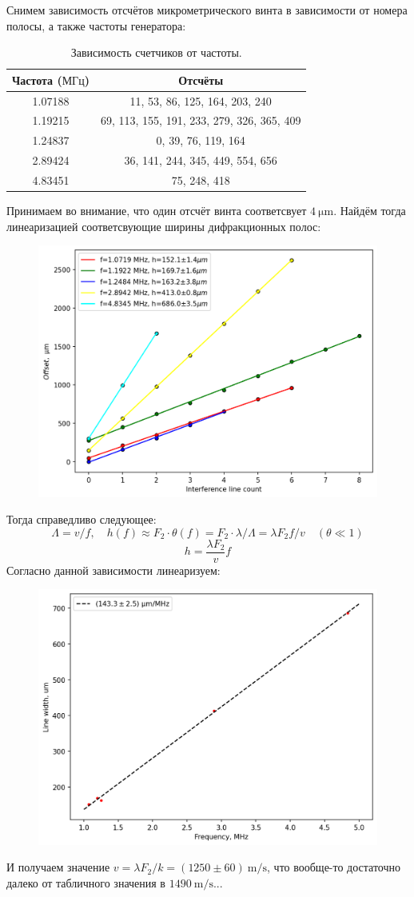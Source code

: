 \documentclass[12pt, a4paper]{article}
\begin{document}
Снимем зависимость отсчётов микрометрического винта в зависимости от номера полосы, а также частоты
генератора:
\begin{table}[H]
  \centering
  \begin{tabular}{|c|c|}
      \hline
      Частота ($\text{МГц}$) & Отсчёты \\ \hline
      1.07188 & 11, 53, 86, 125, 164, 203, 240 \\ \hline
      1.19215 & 69, 113, 155, 191, 233, 279, 326, 365, 409 \\ \hline
      1.24837 & 0, 39, 76, 119, 164 \\ \hline
      2.89424 & 36, 141, 244, 345, 449, 554, 656 \\ \hline
      4.83451 & 75, 248, 418 \\ \hline
  \end{tabular}
  \caption{Зависимость счетчиков от частоты.}
  \label{freq_counts_table}
\end{table}
Принимаем во внимание, что один отсчёт винта соответсвует $4~\mathrm{\mu m}$.
Найдём тогда линеаризацией соответсвующие ширины дифракционных полос:
\begin{figure}[H]
  \includegraphics[width=0.75\linewidth]{pics/line count.png}
\end{figure}
Тогда справедливо следующее:
$$\Lambda = v/f, \quad h(f) \approx F_2 \cdot \theta(f) = F_2 \cdot \lambda/\Lambda = \lambda F_2 f / v \quad(\theta \ll 1)$$
$$h = \frac{\lambda F_2}{v} f$$
Согласно данной зависимости линеаризуем:
\begin{figure}[H]
  \includegraphics[width=0.75\linewidth]{pics/speed_of_sound_1.png}
\end{figure}
И получаем значение $v = \lambda F_2 / k = (1250\pm60)~\mathrm{m/s}$,
что вообще-то достаточно далеко от табличного значения в $1490~\mathrm{m/s}$...
\end{document}
